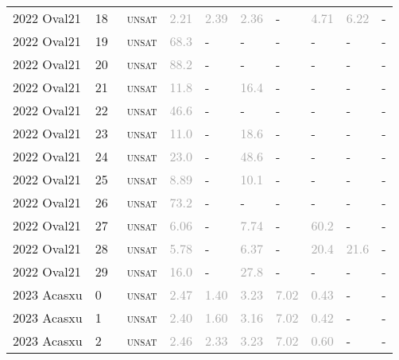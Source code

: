 \begin{center}
{\begin{longtable}{@{}llllllllll@{}}
2022 Oval21 & 18 & ~\textsc{unsat} & \textcolor{darkgray}{2.21} & \textcolor{darkgray}{2.39} & \textcolor{darkgray}{2.36} & - & \textcolor{darkgray}{4.71} & \textcolor{darkgray}{6.22} & - \\
2022 Oval21 & 19 & ~\textsc{unsat} & \textcolor{darkgray}{68.3} & - & - & - & - & - & - \\
2022 Oval21 & 20 & ~\textsc{unsat} & \textcolor{darkgray}{88.2} & - & - & - & - & - & - \\
2022 Oval21 & 21 & ~\textsc{unsat} & \textcolor{darkgray}{11.8} & - & \textcolor{darkgray}{16.4} & - & - & - & - \\
2022 Oval21 & 22 & ~\textsc{unsat} & \textcolor{darkgray}{46.6} & - & - & - & - & - & - \\
2022 Oval21 & 23 & ~\textsc{unsat} & \textcolor{darkgray}{11.0} & - & \textcolor{darkgray}{18.6} & - & - & - & - \\
2022 Oval21 & 24 & ~\textsc{unsat} & \textcolor{darkgray}{23.0} & - & \textcolor{darkgray}{48.6} & - & - & - & - \\
2022 Oval21 & 25 & ~\textsc{unsat} & \textcolor{darkgray}{8.89} & - & \textcolor{darkgray}{10.1} & - & - & - & - \\
2022 Oval21 & 26 & ~\textsc{unsat} & \textcolor{darkgray}{73.2} & - & - & - & - & - & - \\
2022 Oval21 & 27 & ~\textsc{unsat} & \textcolor{darkgray}{6.06} & - & \textcolor{darkgray}{7.74} & - & \textcolor{darkgray}{60.2} & - & - \\
2022 Oval21 & 28 & ~\textsc{unsat} & \textcolor{darkgray}{5.78} & - & \textcolor{darkgray}{6.37} & - & \textcolor{darkgray}{20.4} & \textcolor{darkgray}{21.6} & - \\
2022 Oval21 & 29 & ~\textsc{unsat} & \textcolor{darkgray}{16.0} & - & \textcolor{darkgray}{27.8} & - & - & - & - \\
\midrule
2023 Acasxu & 0 & ~\textsc{unsat} & \textcolor{darkgray}{2.47} & \textcolor{darkgray}{1.40} & \textcolor{darkgray}{3.23} & \textcolor{darkgray}{7.02} & \textcolor{darkgray}{0.43} & - & - \\
2023 Acasxu & 1 & ~\textsc{unsat} & \textcolor{darkgray}{2.40} & \textcolor{darkgray}{1.60} & \textcolor{darkgray}{3.16} & \textcolor{darkgray}{7.02} & \textcolor{darkgray}{0.42} & - & - \\
2023 Acasxu & 2 & ~\textsc{unsat} & \textcolor{darkgray}{2.46} & \textcolor{darkgray}{2.33} & \textcolor{darkgray}{3.23} & \textcolor{darkgray}{7.02} & \textcolor{darkgray}{0.60} & - & - \\

\end{longtable}}
\end{center}
